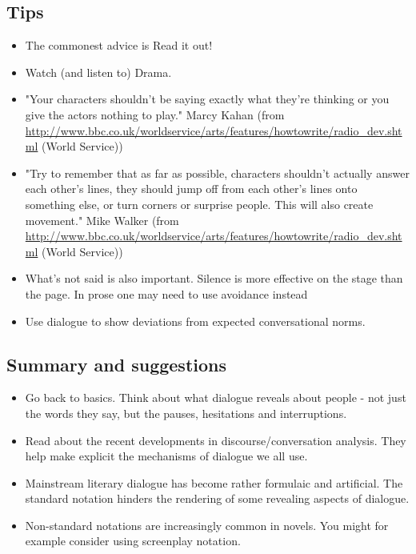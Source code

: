 \documentclass[11pt]{article}
\begin{document}
\subsection*{Tips}
\begin{itemize}
\item The commonest advice is Read it out!
\item Watch (and listen to) Drama.


\item "Your characters shouldn't be saying exactly what they're thinking or you give the actors nothing to play."
Marcy Kahan (from \url{http://www.bbc.co.uk/worldservice/arts/features/howtowrite/radio_dev.shtml} (World Service))

\item "Try to remember that as far as possible, characters shouldn't actually answer each other's lines, they should jump off from each other's lines onto something else, or turn corners or surprise people. This will also create movement."
Mike Walker (from \url{http://www.bbc.co.uk/worldservice/arts/features/howtowrite/radio_dev.shtml} (World Service))

\item What's not said is also important.  Silence is more effective on the stage than the page. In prose one may need to use avoidance instead
\item Use dialogue to show deviations from expected conversational norms.
\end{itemize}


\subsection*{Summary and suggestions}
\begin{itemize}
\item Go back to basics. Think about what dialogue reveals about people - not just the words they say, but the pauses, hesitations and interruptions.

\item Read about the recent developments in discourse/conversation analysis. They help make explicit the mechanisms of dialogue we all use.

\item Mainstream literary dialogue has become rather formulaic and artificial. The standard notation hinders the rendering of some revealing aspects of dialogue.

\item Non-standard notations are increasingly common in novels. You might for example consider using screenplay notation.


\end{itemize}
\end{document}
